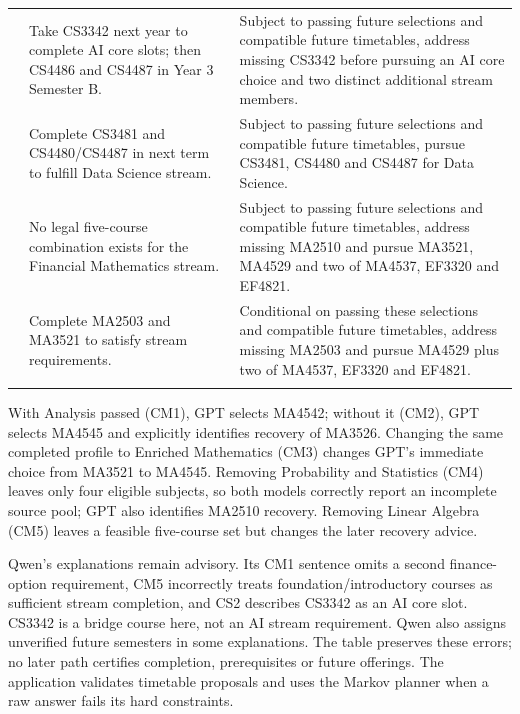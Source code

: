 \documentclass{article}
\begin{document}
{\begin{longtable}{p{0.45in}p{2.35in}p{2.35in}}
\addlinespace[4pt]
{\raggedright CS2\par} & {\raggedright Take CS3342 next year to complete AI core slots; then CS4486 and CS4487 in Year 3 Semester B.\par} & {\raggedright Subject to passing future selections and compatible future timetables, address missing CS3342 before pursuing an AI core choice and two distinct additional stream members.\par}\\
\addlinespace[4pt]
{\raggedright CS3\par} & {\raggedright Complete CS3481 and CS4480/CS4487 in next term to fulfill Data Science stream.\par} & {\raggedright Subject to passing future selections and compatible future timetables, pursue CS3481, CS4480 and CS4487 for Data Science.\par}\\
\addlinespace[4pt]
{\raggedright CM4\par} & {\raggedright No legal five-course combination exists for the Financial Mathematics stream.\par} & {\raggedright Subject to passing future selections and compatible future timetables, address missing MA2510 and pursue MA3521, MA4529 and two of MA4537, EF3320 and EF4821.\par}\\
\addlinespace[4pt]
{\raggedright CM5\par} & {\raggedright Complete MA2503 and MA3521 to satisfy stream requirements.\par} & {\raggedright Conditional on passing these selections and compatible future timetables, address missing MA2503 and pursue MA4529 plus two of MA4537, EF3320 and EF4821.\par}\\
\addlinespace[4pt]
\end{longtable}
}

With Analysis passed (CM1), GPT selects MA4542; without it (CM2), GPT selects MA4545 and explicitly identifies recovery of MA3526. Changing the same completed profile to Enriched Mathematics (CM3) changes GPT's immediate choice from MA3521 to MA4545. Removing Probability and Statistics (CM4) leaves only four eligible subjects, so both models correctly report an incomplete source pool; GPT also identifies MA2510 recovery. Removing Linear Algebra (CM5) leaves a feasible five-course set but changes the later recovery advice.

Qwen's explanations remain advisory. Its CM1 sentence omits a second finance-option requirement, CM5 incorrectly treats foundation/introductory courses as sufficient stream completion, and CS2 describes CS3342 as an AI core slot. CS3342 is a bridge course here, not an AI stream requirement. Qwen also assigns unverified future semesters in some explanations. The table preserves these errors; no later path certifies completion, prerequisites or future offerings. The application validates timetable proposals and uses the Markov planner when a raw answer fails its hard constraints.
\end{document}
